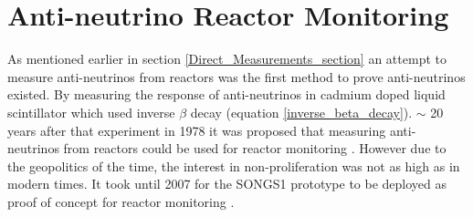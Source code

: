 
\section{Anti-neutrino Reactor Monitoring}
As mentioned earlier in section \ref{Direct_Measurements_section} an attempt to measure anti-neutrinos from reactors was the first method to prove anti-neutrinos existed. By measuring the response of anti-neutrinos in cadmium doped liquid scintillator \cite{Cowan1956Confirmation} which used inverse $\beta$ decay (equation \ref{inverse_beta_decay}). $\sim$ 20 years after that experiment in 1978 it was proposed that measuring anti-neutrinos from reactors could be used for reactor monitoring \cite{Borovoi_1978}. However due to the geopolitics of the time, the interest in non-proliferation was not as high as in modern times. It took until 2007 for the SONGS1 prototype to be deployed as proof of concept for reactor monitoring \cite{Bowden_2007}. 
